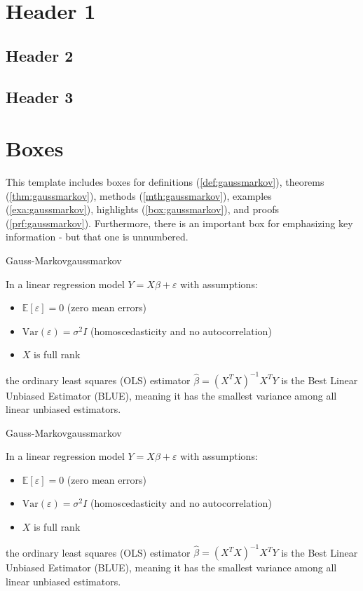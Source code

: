 \section{Header 1}
\lipsum[1]

\subsection{Header 2}
\lipsum[2]

\subsection{Header 3}
\lipsum[3]

\section{Boxes}

This template includes boxes for definitions (\cref{def:gaussmarkov}), theorems (\cref{thm:gaussmarkov}), methods (\cref{mth:gaussmarkov}), examples (\cref{exa:gaussmarkov}), highlights (\cref{box:gaussmarkov}), and proofs (\cref{prf:gaussmarkov}). Furthermore, there is an important box for emphasizing key information - but that one is unnumbered.

\begin{definition}{Gauss-Markov}{gaussmarkov}

In a linear regression model $Y = X\beta + \varepsilon$ with assumptions:
\begin{itemize}
    \item $\mathbb{E}[\varepsilon] = 0$ (zero mean errors)
    \item $\text{Var}(\varepsilon) = \sigma^2 I$ (homoscedasticity and no autocorrelation)
    \item $X$ is full rank
\end{itemize}
the ordinary least squares (OLS) estimator $\hat{\beta} = (X^TX)^{-1}X^TY$ 
is the Best Linear Unbiased Estimator (BLUE), meaning it has the smallest 
variance among all linear unbiased estimators.

\end{definition}

\begin{theorem}{Gauss-Markov}{gaussmarkov}

In a linear regression model $Y = X\beta + \varepsilon$ with assumptions:
\begin{itemize}
    \item $\mathbb{E}[\varepsilon] = 0$ (zero mean errors)
    \item $\text{Var}(\varepsilon) = \sigma^2 I$ (homoscedasticity and no autocorrelation)
    \item $X$ is full rank
\end{itemize}
the ordinary least squares (OLS) estimator $\hat{\beta} = (X^TX)^{-1}X^TY$ 
is the Best Linear Unbiased Estimator (BLUE), meaning it has the smallest 
variance among all linear unbiased estimators.

\end{theorem}

